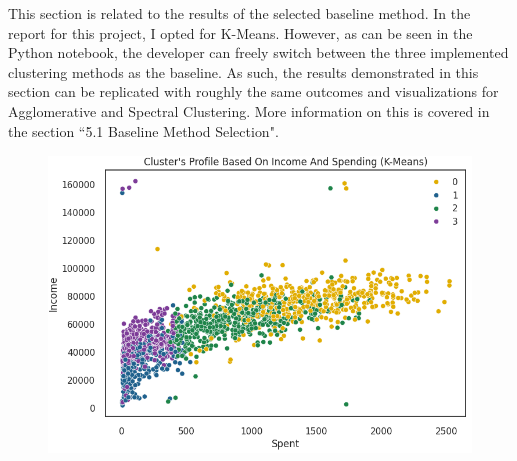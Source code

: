 \documentclass[11pt]{article}
\begin{document}
This section is related to the results of the selected baseline method. In the report for this project, I opted for K-Means. However, as can be seen in the Python notebook, the developer can freely switch between the three implemented clustering methods as the baseline. As such, the results demonstrated in this section can be replicated with roughly the same outcomes and visualizations for Agglomerative and Spectral Clustering. More information on this is covered in the section ``5.1 Baseline Method Selection".

\vspace{1\baselineskip}
\begin{figure}[H]
\centering
\includegraphics[width=11.35cm,height=7.9cm]{./images/image3.png}
\end{figure}
\end{document}
